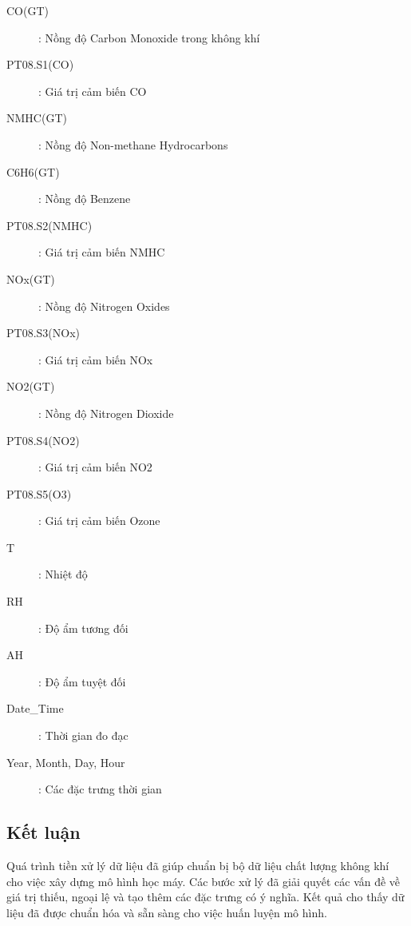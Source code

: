 \begin{description}
    \item[CO(GT)]: Nồng độ Carbon Monoxide trong không khí
    \item[PT08.S1(CO)]: Giá trị cảm biến CO
    \item[NMHC(GT)]: Nồng độ Non-methane Hydrocarbons
    \item[C6H6(GT)]: Nồng độ Benzene
    \item[PT08.S2(NMHC)]: Giá trị cảm biến NMHC
    \item[NOx(GT)]: Nồng độ Nitrogen Oxides
    \item[PT08.S3(NOx)]: Giá trị cảm biến NOx
    \item[NO2(GT)]: Nồng độ Nitrogen Dioxide
    \item[PT08.S4(NO2)]: Giá trị cảm biến NO2
    \item[PT08.S5(O3)]: Giá trị cảm biến Ozone
    \item[T]: Nhiệt độ
    \item[RH]: Độ ẩm tương đối
    \item[AH]: Độ ẩm tuyệt đối
    \item[Date\_Time]: Thời gian đo đạc
    \item[Year, Month, Day, Hour]: Các đặc trưng thời gian
\end{description}

\subsection{Kết luận}
\hspace{0.5cm}Quá trình tiền xử lý dữ liệu đã giúp chuẩn bị bộ dữ liệu chất lượng không khí cho việc xây dựng mô hình học máy. Các bước xử lý đã giải quyết các vấn đề về giá trị thiếu, ngoại lệ và tạo thêm các đặc trưng có ý nghĩa. Kết quả cho thấy dữ liệu đã được chuẩn hóa và sẵn sàng cho việc huấn luyện mô hình.
